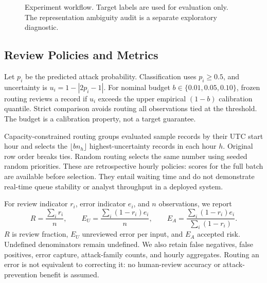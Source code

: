 \documentclass[manuscript,screen,nonacm]{acmart}
\begin{document}
\begin{figure}[t]
\centering
{}
\caption{Experiment workflow. Target labels are used for evaluation only. The representation ambiguity audit is a separate exploratory diagnostic.}
\end{figure}

\subsection{Review Policies and Metrics}
Let $p_i$ be the predicted attack probability. Classification uses $p_i\geq0.5$, and uncertainty is $u_i=1-|2p_i-1|$. For nominal budget $b\in\{0.01,0.05,0.10\}$, frozen routing reviews a record if $u_i$ exceeds the upper empirical $(1-b)$ calibration quantile. Strict comparison avoids routing all observations tied at the threshold. The budget is a calibration property, not a target guarantee.

Capacity-constrained routing groups evaluated sample records by their UTC start hour and selects the $\lfloor bn_h\rfloor$ highest-uncertainty records in each hour $h$. Original row order breaks ties. Random routing selects the same number using seeded random priorities. These are retrospective hourly policies: scores for the full batch are available before selection. They entail waiting time and do not demonstrate real-time queue stability or analyst throughput in a deployed system.

For review indicator $r_i$, error indicator $e_i$, and $n$ observations, we report
\begin{equation}
R=\frac{\sum_i r_i}{n},\qquad E_U=\frac{\sum_i(1-r_i)e_i}{n},\qquad E_A=\frac{\sum_i(1-r_i)e_i}{\sum_i(1-r_i)}.
\end{equation}
$R$ is review fraction, $E_U$ unreviewed error per input, and $E_A$ accepted risk. Undefined denominators remain undefined. We also retain false negatives, false positives, error capture, attack-family counts, and hourly aggregates. Routing an error is not equivalent to correcting it: no human-review accuracy or attack-prevention benefit is assumed.
\end{document}
